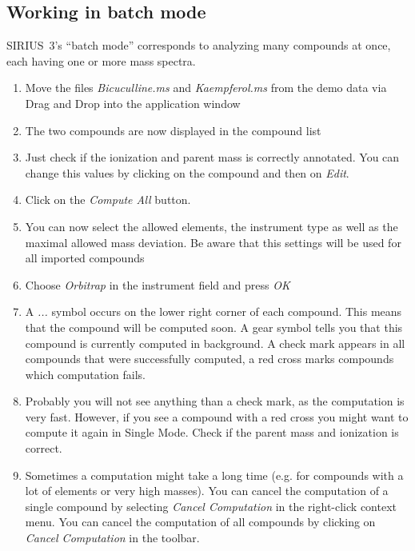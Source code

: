 \documentclass[letterpaper,10pt,openany,oneside]{sphinxmanual}
\begin{document}
\subsection{Working in batch mode}

SIRIUS~3's ``batch mode'' corresponds to analyzing many compounds at once,
each having one or more mass spectra.

\begin{enumerate}
\item {} 
Move the files \emph{Bicuculline.ms} and \emph{Kaempferol.ms} from the demo data via Drag and Drop into the application window

\item {} 
The two compounds are now displayed in the compound list

\item {} 
Just check if the ionization and parent mass is correctly annotated. You can change this values by clicking on the compound and then on \emph{Edit}.

\item {} 
Click on the \emph{Compute All} button.

\item {} 
You can now select the allowed elements, the instrument type as well as the maximal allowed mass deviation. Be aware that this settings will be used for all imported compounds

\item {} 
Choose \emph{Orbitrap} in the instrument field and press \emph{OK}

\item {} 
A \emph{...} symbol occurs on the lower right corner of each compound. This 
means that the compound will be computed soon. A gear symbol tells you that 
this compound is currently computed in background. A check mark appears in 
all compounds that were successfully computed, a red cross marks compounds 
which computation fails.

\item {} 
Probably you will not see anything than a check mark, as the computation is very fast. However, if you see a compound with a red cross you might want to compute it again in Single Mode. Check if the parent mass and ionization is correct.

\item {} 
Sometimes a computation might take a long time (e.g. for compounds with a lot 
of elements or very high masses). You can cancel the computation of a single 
compound by selecting \emph{Cancel Computation} in the right-click context 
menu. You can cancel the computation of all compounds by clicking on 
\emph{Cancel Computation} in the toolbar.
\end{enumerate}
\end{document}
